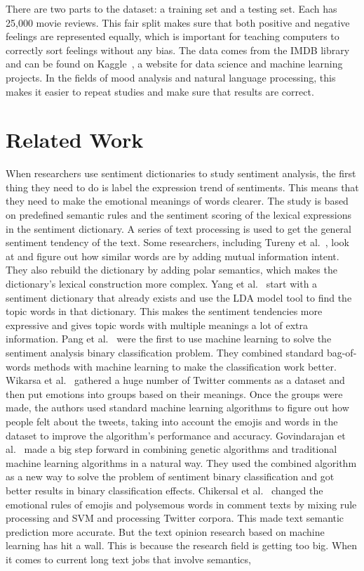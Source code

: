 \documentclass[11pt,a4paper]{article}
\begin{document}
There are two parts to the dataset: a training set and a testing set. Each has 25,000 movie reviews. This fair split makes sure that both positive and negative feelings are represented equally, which is important for teaching computers to correctly sort feelings without any bias. The data comes from the IMDB library and can be found on Kaggle~\citep{maas2011learning}, a website for data science and machine learning projects. In the fields of mood analysis and natural language processing, this makes it easier to repeat studies and make sure that results are correct.


\section{Related Work}

When researchers use sentiment dictionaries to study sentiment analysis, the first thing they need to do is label the expression trend of sentiments. This means that they need to make the emotional meanings of words clearer. The study is based on predefined semantic rules and the sentiment scoring of the lexical expressions in the sentiment dictionary. A series of text processing is used to get the general sentiment tendency of the text. Some researchers, including Tureny et al.~\citep{turney2007anatomy}, look at and figure out how similar words are by adding mutual information intent. They also rebuild the dictionary by adding polar semantics, which makes the dictionary's lexical construction more complex. Yang et al.~\citep{chen2013emotional} start with a sentiment dictionary that already exists and use the LDA model tool to find the topic words in that dictionary. This makes the sentiment tendencies more expressive and gives topic words with multiple meanings a lot of extra information. Pang et al.~\citep{pang2002thumbs} were the first to use machine learning to solve the sentiment analysis binary classification problem. They combined standard bag-of-words methods with machine learning to make the classification work better. Wikarsa et al.~\citep{wikarsa2015text} gathered a huge number of Twitter comments as a dataset and then put emotions into groups based on their meanings. Once the groups were made, the authors used standard machine learning algorithms to figure out how people felt about the tweets, taking into account the emojis and words in the dataset to improve the algorithm's performance and accuracy. Govindarajan et al.~\citep{govindarajan2013sentiment} made a big step forward in combining genetic algorithms and traditional machine learning algorithms in a natural way. They used the combined algorithm as a new way to solve the problem of sentiment binary classification and got better results in binary classification effects. Chikersal et al.~\citep{chikersal2015sentu} changed the emotional rules of emojis and polysemous words in comment texts by mixing rule processing and SVM and processing Twitter corpora. This made text semantic prediction more accurate. But the text opinion research based on machine learning has hit a wall. This is because the research field is getting too big. When it comes to current long text jobs that involve semantics, 
\end{document}
